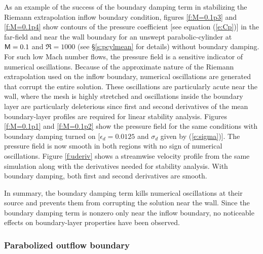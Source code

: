 As an example of the success of the boundary damping term in stabilizing the
Riemann extrapolation inflow boundary condition, figures \ref{f:M=0.1p3} and
\ref{f:M=0.1p4} show contours of the pressure coefficient [see equation
(\ref{e:Cp})] in the far-field and near the wall boundary for an unswept
parabolic-cylinder at ${\sf M}=0.1$ and $\Re=1000$ (see \S\ref{s:pcylmean} for
details) without boundary damping.  For such low Mach number flows, the
pressure field is a sensitive indicator of numerical oscillations.  Because of
the approximate nature of the Riemann extrapolation used on the inflow
boundary, numerical oscillations are generated that corrupt the entire
solution.  These oscillations are particularly acute near the wall, where the
mesh is highly stretched and oscillations inside the boundary layer are
particularly deleterious since first and second derivatives of the mean
boundary-layer profiles are required for linear stability analysis.  Figures
\ref{f:M=0.1p1} and \ref{f:M=0.1p2} show the pressure field for the same
conditions with boundary damping turned on [$\epsilon_d = 0.0125$ and
$\sigma_d$ given by (\ref{e:sigma})].  The pressure field is now smooth in both
regions with no sign of numerical oscillations.  Figure \ref{f:uderiv} shows a
streamwise velocity profile from the same simulation along with the
derivatives needed for stability analysis.  With boundary damping, both first
and second derivatives are smooth.


In summary, the boundary damping term kills numerical oscillations at their
source and prevents them from corrupting the solution near the wall.  Since
the boundary damping term is nonzero only near the inflow boundary, no
noticeable effects on boundary-layer properties have been observed.

\subsubsection{Parabolized outflow boundary \label{sss:ParabolicBC} }

